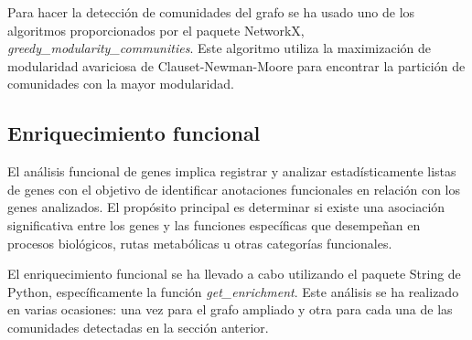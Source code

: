 Para hacer la detección de comunidades del grafo se ha usado uno de los algoritmos proporcionados por el paquete NetworkX,\textit{ greedy\_modularity\_communities}. Este algoritmo utiliza la maximización de modularidad avariciosa de Clauset-Newman-Moore \cite{Clauset2004} para encontrar la partición de comunidades con la mayor modularidad.


\subsection{Enriquecimiento funcional}

El análisis funcional de genes implica registrar y analizar estadísticamente listas de genes con el objetivo de identificar anotaciones funcionales en relación con los genes analizados. El propósito principal es determinar si existe una asociación significativa entre los genes y las funciones específicas que desempeñan en procesos biológicos, rutas metabólicas u otras categorías funcionales. 

El enriquecimiento funcional se ha llevado a cabo utilizando el paquete String de Python, específicamente la función \textit{get\_enrichment}. Este análisis se ha realizado en varias ocasiones: una vez para el grafo ampliado y otra para cada una de las comunidades detectadas en la sección anterior.
